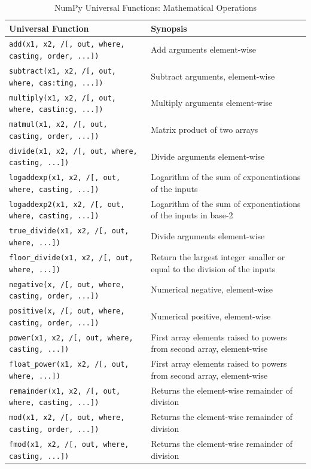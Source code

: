 \documentclass[a4paper,11pt]{book}
\begin{document}
\begin{appendices}
\begin{table}
\caption{NumPy Universal Functions: Mathematical Operations}
\label{tab:numpy_math_ufuncs}
\centering
\begin{tabular}{lp{13cm}}
\toprule \toprule 
Universal Function & Synopsis \\
\midrule
\texttt{add(x1, x2, /[, out, where, casting, order, ...])}& Add arguments element-wise\\
\texttt{subtract(x1, x2, /[, out, where, cas:ting, ...])}& Subtract arguments, element-wise\\
\texttt{multiply(x1, x2, /[, out, where, castin:g, ...])}& Multiply arguments element-wise\\
\texttt{matmul(x1, x2, /[, out, casting, order, ...])}& Matrix product of two arrays\\
\texttt{divide(x1, x2, /[, out, where, casting, ...])}& Divide arguments element-wise\\
\texttt{logaddexp(x1, x2, /[, out, where, casting, ...])}& Logarithm of the sum of exponentiations of the inputs\\
\texttt{logaddexp2(x1, x2, /[, out, where, casting, ...])}& Logarithm of the sum of exponentiations of the inputs in base-2\\
\texttt{true\_divide(x1, x2, /[, out, where, ...])}& Divide arguments element-wise\\
\texttt{floor\_divide(x1, x2, /[, out, where, ...])}& Return the largest integer smaller or equal to the division of the inputs\\
\texttt{negative(x, /[, out, where, casting, order, ...])}& Numerical negative, element-wise\\
\texttt{positive(x, /[, out, where, casting, order, ...])}& Numerical positive, element-wise\\
\texttt{power(x1, x2, /[, out, where, casting, ...])}& First array elements raised to powers from second array, element-wise\\
\texttt{float\_power(x1, x2, /[, out, where, ...])}& First array elements raised to powers from second array, element-wise\\
\texttt{remainder(x1, x2, /[, out, where, casting, ...])}& Returns the element-wise remainder of division\\
\texttt{mod(x1, x2, /[, out, where, casting, order, ...])}& Returns the element-wise remainder of division\\
\texttt{fmod(x1, x2, /[, out, where, casting, ...])}& Returns the element-wise remainder of division\\

\end{tabular}
\end{table}
\end{appendices}
\end{document}
